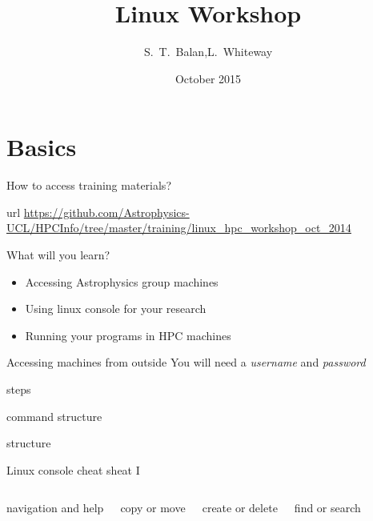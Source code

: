 \documentclass{beamer}
\title[Linux  Workshop] %
{Linux  Workshop}
\author[Balan,Whiteway] %
{S.~T.~Balan,L.~Whiteway}
\institute[UCL]
{
  Department of Physics and Astronomy\\
  University College London
}
\date[Linux  2015]
{October 2015}
\begin{document}
\frame{\titlepage}

\section{Basics}

\begin{frame}{How to access training materials?}
  \begin{block}{url}
    \url{https://github.com/Astrophysics-UCL/HPCInfo/tree/master/training/linux_hpc_workshop_oct_2014}
  \end{block}
\end{frame}


\begin{frame}{What will you learn?}
  \begin{itemize}
    \item Accessing Astrophysics group machines
    \item Using linux console for your research
    \item Running your programs in HPC machines
  \end{itemize}
\end{frame}

\begin{frame}[fragile]{Accessing machines from outside}
  \alert{You will need a \emph{username} and \emph{password}}
  \begin{block}{steps}
    
  \end{block}
\end{frame}

\begin{frame}[fragile]{command structure}
  \begin{block}{structure}
    
  \end{block}
  \begin{example}
    
  \end{example}
\end{frame}


\begin{frame}[fragile]{Linux console cheat sheat I}
  \fontsize{7pt}{7}\selectfont
  \begin{columns}
    \begin{block}{navigation and help}
      
    \end{block}
    \begin{block}{copy or move}
      
    \end{block}

    \begin{block}{create or delete}
      
    \end{block}
    \begin{block}{find or search}
      
    \end{block}
  \end{columns}
\end{frame}
\end{document}
